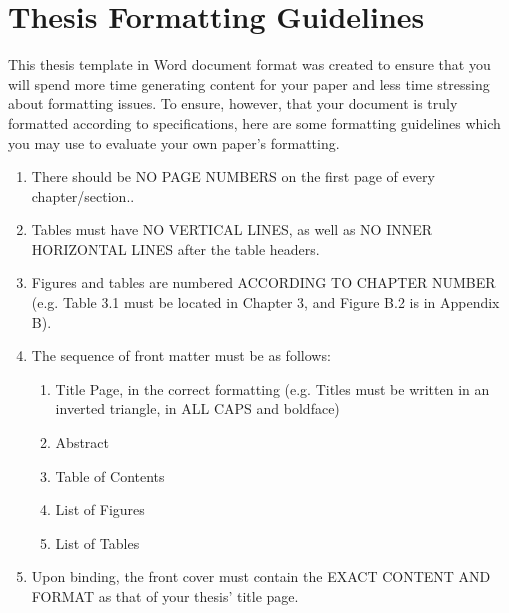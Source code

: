 \section{Thesis Formatting Guidelines}

This thesis template in Word document format was created to ensure that you will spend more time generating content for your paper and less time stressing about formatting issues. To ensure, however, that your document is truly formatted according to specifications, here are some formatting guidelines which you may use to evaluate your own paper’s formatting.

\begin{enumerate}
\item There should be NO PAGE NUMBERS on the first page of every chapter/section..
\item Tables must have NO VERTICAL LINES, as well as NO INNER HORIZONTAL LINES after the table headers.
\item Figures and tables are numbered ACCORDING TO CHAPTER NUMBER (e.g. Table 3.1 must be located in Chapter 3, and Figure B.2 is in Appendix B).
\item The sequence of front matter must be as follows:
    \begin{enumerate}
    \item Title Page, in the correct formatting (e.g. Titles must be written in an inverted triangle, in ALL CAPS and boldface)
    \item Abstract
	\item Table of Contents
	\item List of Figures
	\item List of Tables
	\end{enumerate}
\item Upon binding, the front cover must contain the EXACT CONTENT AND FORMAT as that of your thesis’ title page.
\end{enumerate}
